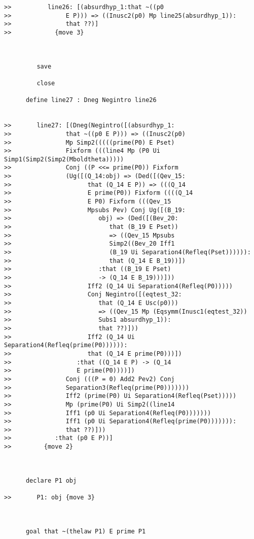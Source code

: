 \documentclass[12pt]{article}
\begin{document}
\begin{verbatim}
>>          line26: [(absurdhyp_1:that ~((p0
>>               E P))) => ((Inusc2(p0) Mp line25(absurdhyp_1)):
>>               that ??)]
>>            {move 3}



         save

         close

      define line27 : Dneg Negintro line26


>>       line27: [(Dneg(Negintro([(absurdhyp_1:
>>               that ~((p0 E P))) => ((Inusc2(p0)
>>               Mp Simp2(((((prime(P0) E Pset)
>>               Fixform (((line4 Mp (P0 Ui Simp1(Simp2(Simp2(Mboldtheta)))))
>>               Conj ((P <<= prime(P0)) Fixform
>>               (Ug([(Q_14:obj) => (Ded([(Qev_15:
>>                     that (Q_14 E P)) => (((Q_14
>>                     E prime(P0)) Fixform ((((Q_14
>>                     E P0) Fixform (((Qev_15
>>                     Mpsubs Pev) Conj Ug([(B_19:
>>                        obj) => (Ded([(Bev_20:
>>                           that (B_19 E Pset))
>>                           => ((Qev_15 Mpsubs
>>                           Simp2((Bev_20 Iff1
>>                           (B_19 Ui Separation4(Refleq(Pset)))))):
>>                           that (Q_14 E B_19))])
>>                        :that ((B_19 E Pset)
>>                        -> (Q_14 E B_19)))]))
>>                     Iff2 (Q_14 Ui Separation4(Refleq(P0)))))
>>                     Conj Negintro([(eqtest_32:
>>                        that (Q_14 E Usc(p0)))
>>                        => ((Qev_15 Mp (Eqsymm(Inusc1(eqtest_32))
>>                        Subs1 absurdhyp_1)):
>>                        that ??)]))
>>                     Iff2 (Q_14 Ui Separation4(Refleq(prime(P0)))))):
>>                     that (Q_14 E prime(P0)))])
>>                  :that ((Q_14 E P) -> (Q_14
>>                  E prime(P0))))])
>>               Conj (((P = 0) Add2 Pev2) Conj
>>               Separation3(Refleq(prime(P0)))))))
>>               Iff2 (prime(P0) Ui Separation4(Refleq(Pset)))))
>>               Mp (prime(P0) Ui Simp2((line14
>>               Iff1 (p0 Ui Separation4(Refleq(P0)))))))
>>               Iff1 (p0 Ui Separation4(Refleq(prime(P0))))))):
>>               that ??)]))
>>            :that (p0 E P))]
>>         {move 2}



      declare P1 obj

>>       P1: obj {move 3}



      goal that ~(thelaw P1) E prime P1


\end{verbatim}
\end{document}
